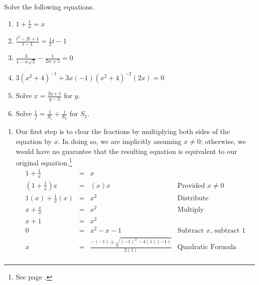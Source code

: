 \documentclass{ximera}
\begin{document}
\begin{example}\label{rateqnreviewex} Solve the following equations.

\begin{enumerate}


\item  $1 + \frac{1}{x} = x$

\item  $\frac{t^3-2t+1}{t-1} = \frac{1}{2}t-1$


\item  $\frac{3}{1 - w\sqrt{2}} - \frac{1}{2w+5} = 0$

\item $3(x^2+4)^{-1} + 3x(-1)(x^2+4)^{-2}(2x) = 0$

\item  Solve $x = \frac{2y+1}{y-3}$ for $y$. 

\item  Solve $\frac{1}{f} = \frac{1}{S_1} + \frac{1}{S_2}$ for $S_{1}$.

\end{enumerate}

\begin{explanation}

\begin{enumerate}

\item   Our first step is to clear the fractions by multiplying both sides of the equation by $x$. In doing so, we are implicitly assuming $x \neq 0$; otherwise, we would have no guarantee that the resulting equation is equivalent to our original equation.\footnote{See page \pageref{equivalenteqnineq}.}\[ \begin{array}{rclr}

1 + \frac{1}{x} & = & x & \\  

\left(1 + \frac{1}{x}\right) x & = & (x)x & \text{Provided $x \neq 0$} \\  


1(x) + \frac{1}{x} (x) & = & x^2 & \text{Distribute} \\  

x + \frac{x}{x} & = & x^2 & \text{Multiply} \\  

x + 1 & = & x^2 &  \\

0 & = & x^2 - x - 1 & \text{Subtract $x$, subtract $1$} \\  

x & = & \frac{-(-1) \pm \sqrt{(-1)^2 - 4(1)(-1)}}{2(1)} & \text{Quadratic Formula} \\


\end{array}\]
\end{enumerate}
\end{explanation}
\end{example}
\end{document}

